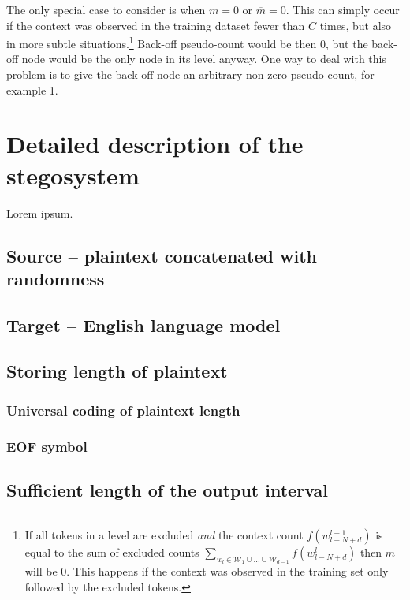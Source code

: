 \documentclass[draft]{IIBproject}
\begin{document}
The only special case to consider is when $m=0$ or $\overline m = 0$. This can simply occur if the context was observed in the training dataset fewer than $C$ times, but also in more subtle situations.\footnote{If all tokens in a level are excluded \emph{and} the context count $f(w_{l-N+d}^{l-1})$ is equal to the sum of excluded counts $\sum_{w_l \in \mathcal W_1 \cup \dots \cup \mathcal W_{d-1}} f(w_{l-N+d}^l)$ then $\overline m$ will be 0. This happens if the context was observed in the training set only followed by the excluded tokens.} Back-off pseudo-count would be then 0, but the back-off node would be the only node in its level anyway. One way to deal with this problem is to give the back-off node an arbitrary non-zero pseudo-count, for example 1.

\newpage
\section{Detailed description of the stegosystem}

Lorem ipsum.

\subsection{Source -- plaintext concatenated with randomness}

\subsection{Target -- English language model}

\subsection{Storing length of plaintext}

\subsubsection{Universal coding of plaintext length}

\subsubsection{EOF symbol}

\subsection{Sufficient length of the output interval}
\end{document}
